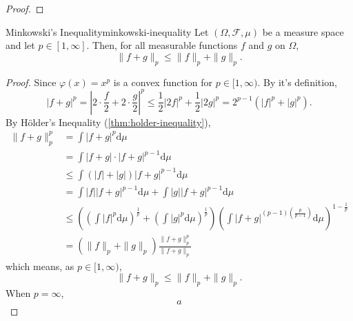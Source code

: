 \begin{proof}
    
\end{proof}

\begin{theorem}{Minkowski's Inequality}{minkowski-inequality}
    Let $(\Omega,\mathcal{F},\mu)$ be a measure space and let $p\in[1,\infty]$. Then, for all measurable functions $f$ and $g$ on $\Omega$,
    \begin{equation}
        \|f+g\|_{p} \leq\|f\|_{p}+\|g\|_{p}.
    \end{equation}
\end{theorem}

\begin{proof}
    Since $\varphi(x)=x^p$ is a convex function for $p\in[1,\infty)$. By it's definition,
    \begin{equation*}
        |f+g|^{p}=\left|2\cdot\frac{f}{2}+2\cdot\frac{g}{2}\right|^{p}\leq \frac{1}{2}|2f|^p+\frac{1}{2}|2g|^p=2^{p-1}\left(|f|^{p}+|g|^{p}\right).
    \end{equation*}
    By H\"older's Inequality (\ref{thm:holder-inequality}),
    \begin{equation*}
        \begin{aligned}
            \|f+g\|_{p}^{p} &=\int|f+g|^{p}\mathrm{d}\mu \\
            &=\int|f+g| \cdot|f+g|^{p-1}\mathrm{d} \mu \\
            &\leq \int(|f|+|g|)|f+g|^{p-1}\mathrm{d}\mu \\
            &=\int|f||f+g|^{p-1}\mathrm{d}\mu+\int|g||f+g|^{p-1}\mathrm{d}\mu \\
            & \leq\left(\left(\int|f|^{p} \mathrm{d} \mu\right)^{\frac{1}{p}}+\left(\int|g|^{p} \mathrm{d} \mu\right)^{\frac{1}{p}}\right)\left(\int|f+g|^{(p-1)\left(\frac{p}{p-1}\right)} \mathrm{d} \mu\right)^{1-\frac{1}{p}} \\
            &=\left(\|f\|_{p}+\|g\|_{p}\right) \frac{\|f+g\|_{p}^{p}}{\|f+g\|_{p}}
        \end{aligned}
    \end{equation*}
    which means, as $p\in[1,\infty)$,
    \begin{equation*}
        \|f+g\|_{p} \leq\|f\|_{p}+\|g\|_{p}.
    \end{equation*}
    When $p=\infty$,
    \begin{equation*}
        a
    \end{equation*}
\end{proof}

